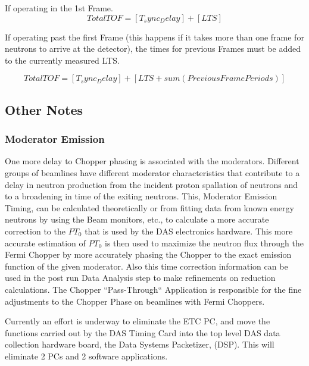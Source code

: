 If operating in the 1st Frame. 
$$Total TOF = [T_sync_ Delay] + [LTS]$$

If operating past the first Frame (this happens if it takes more than one frame for neutrons to arrive at the detector), the times for previous Frames must be added to the currently measured LTS.

$$Total TOF = [T_sync_ Delay] + [LTS + sum(Previous Frame Periods)]$$

\subsection {Other Notes}
\subsubsection {Moderator Emission}
One more delay to Chopper phasing is associated with the moderators.  Different groups of beamlines have different moderator characteristics that contribute to a delay in neutron production from the incident proton spallation of neutrons and to a broadening in time of the exiting neutrons.  This, Moderator Emission Timing, can be calculated theoretically or from fitting data from known energy neutrons by using the Beam monitors, etc., to calculate a more accurate correction to the $PT_0$ that is used by the DAS electronics hardware.  This more accurate estimation of $PT_0$ is then used to maximize the neutron flux through the Fermi Chopper by more accurately phasing the Chopper to the exact emission function of the given moderator.   Also this time correction information can be used in the post run Data Analysis step to make refinements on reduction calculations.   The Chopper ``Pass-Through`` Application is responsible for the fine adjustments to the Chopper Phase on beamlines with Fermi Choppers.

Currently an effort is underway to eliminate the ETC PC, and move the functions carried out by the DAS Timing Card into the top level DAS data collection hardware board, the Data Systems Packetizer, (DSP).  This will eliminate 2 PCs and 2 software applications.  